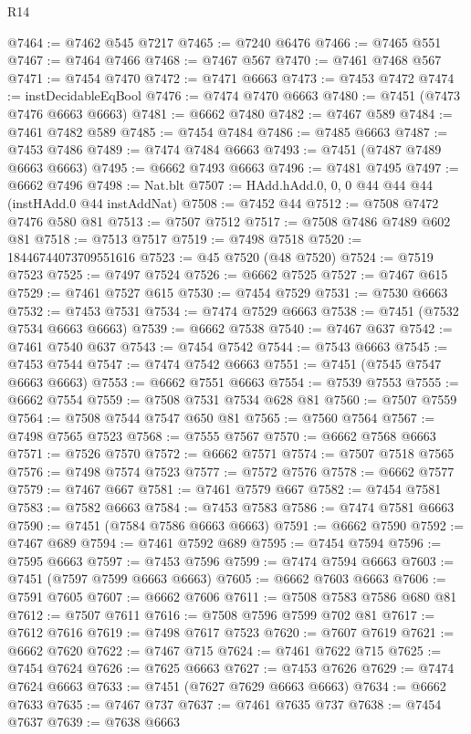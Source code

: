 \begin{lexlean}{R14}
\begin{coremodule}
@7464 := @7462 @545 @7217
@7465 := @7240 @6476
@7466 := @7465 @551
@7467 := @7464 @7466
@7468 := @7467 @567
@7470 := @7461 @7468 @567
@7471 := @7454 @7470
@7472 := @7471 @6663
@7473 := @7453 @7472
@7474 := instDecidableEqBool
@7476 := @7474 @7470 @6663
@7480 := @7451 (@7473 @7476 @6663 @6663)
@7481 := @6662 @7480
@7482 := @7467 @589
@7484 := @7461 @7482 @589
@7485 := @7454 @7484
@7486 := @7485 @6663
@7487 := @7453 @7486
@7489 := @7474 @7484 @6663
@7493 := @7451 (@7487 @7489 @6663 @6663)
@7495 := @6662 @7493 @6663
@7496 := @7481 @7495
@7497 := @6662 @7496
@7498 := Nat.blt
@7507 := HAdd.hAdd.{0, 0, 0} @44 @44 @44 (instHAdd.{0} @44 instAddNat)
@7508 := @7452 @44
@7512 := @7508 @7472 @7476 @580 @81
@7513 := @7507 @7512
@7517 := @7508 @7486 @7489 @602 @81
@7518 := @7513 @7517
@7519 := @7498 @7518
@7520 := 18446744073709551616
@7523 := @45 @7520 (@48 @7520)
@7524 := @7519 @7523
@7525 := @7497 @7524
@7526 := @6662 @7525
@7527 := @7467 @615
@7529 := @7461 @7527 @615
@7530 := @7454 @7529
@7531 := @7530 @6663
@7532 := @7453 @7531
@7534 := @7474 @7529 @6663
@7538 := @7451 (@7532 @7534 @6663 @6663)
@7539 := @6662 @7538
@7540 := @7467 @637
@7542 := @7461 @7540 @637
@7543 := @7454 @7542
@7544 := @7543 @6663
@7545 := @7453 @7544
@7547 := @7474 @7542 @6663
@7551 := @7451 (@7545 @7547 @6663 @6663)
@7553 := @6662 @7551 @6663
@7554 := @7539 @7553
@7555 := @6662 @7554
@7559 := @7508 @7531 @7534 @628 @81
@7560 := @7507 @7559
@7564 := @7508 @7544 @7547 @650 @81
@7565 := @7560 @7564
@7567 := @7498 @7565 @7523
@7568 := @7555 @7567
@7570 := @6662 @7568 @6663
@7571 := @7526 @7570
@7572 := @6662 @7571
@7574 := @7507 @7518 @7565
@7576 := @7498 @7574 @7523
@7577 := @7572 @7576
@7578 := @6662 @7577
@7579 := @7467 @667
@7581 := @7461 @7579 @667
@7582 := @7454 @7581
@7583 := @7582 @6663
@7584 := @7453 @7583
@7586 := @7474 @7581 @6663
@7590 := @7451 (@7584 @7586 @6663 @6663)
@7591 := @6662 @7590
@7592 := @7467 @689
@7594 := @7461 @7592 @689
@7595 := @7454 @7594
@7596 := @7595 @6663
@7597 := @7453 @7596
@7599 := @7474 @7594 @6663
@7603 := @7451 (@7597 @7599 @6663 @6663)
@7605 := @6662 @7603 @6663
@7606 := @7591 @7605
@7607 := @6662 @7606
@7611 := @7508 @7583 @7586 @680 @81
@7612 := @7507 @7611
@7616 := @7508 @7596 @7599 @702 @81
@7617 := @7612 @7616
@7619 := @7498 @7617 @7523
@7620 := @7607 @7619
@7621 := @6662 @7620
@7622 := @7467 @715
@7624 := @7461 @7622 @715
@7625 := @7454 @7624
@7626 := @7625 @6663
@7627 := @7453 @7626
@7629 := @7474 @7624 @6663
@7633 := @7451 (@7627 @7629 @6663 @6663)
@7634 := @6662 @7633
@7635 := @7467 @737
@7637 := @7461 @7635 @737
@7638 := @7454 @7637
@7639 := @7638 @6663

\end{coremodule}
\end{lexlean}
